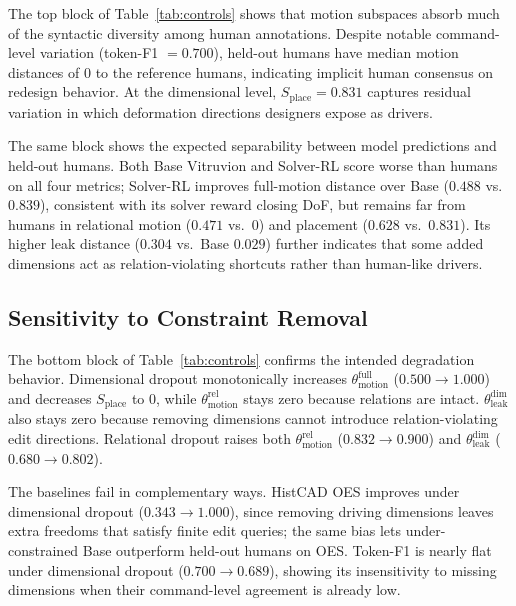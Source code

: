 The top block of Table~\ref{tab:controls} shows that motion subspaces absorb much of the syntactic diversity among human annotations. Despite notable command-level variation (token-F1 $=0.700$), held-out humans have median motion distances of $0$ to the reference humans, indicating implicit human consensus on redesign behavior. At the dimensional level, $S_{\mathrm{place}}=0.831$ captures residual variation in which deformation directions designers expose as drivers.

The same block shows the expected separability between model predictions and held-out humans. Both Base Vitruvion and Solver-RL score worse than humans on all four metrics; Solver-RL improves full-motion distance over Base ($0.488$ vs.\ $0.839$), consistent with its solver reward closing DoF, but remains far from humans in relational motion ($0.471$ vs.\ $0$) and placement ($0.628$ vs.\ $0.831$). Its higher leak distance ($0.304$ vs.\ Base $0.029$) further indicates that some added dimensions act as relation-violating shortcuts rather than human-like drivers.

\subsection{Sensitivity to Constraint Removal}
\label{sec:exp_degradation}

The bottom block of Table~\ref{tab:controls} confirms the intended degradation behavior. Dimensional dropout monotonically increases $\theta_{\mathrm{motion}}^{\mathrm{full}}$ ($0.500\!\to\!1.000$) and decreases $S_{\mathrm{place}}$ to $0$, while $\theta_{\mathrm{motion}}^{\mathrm{rel}}$ stays zero because relations are intact. $\theta_{\mathrm{leak}}^{\mathrm{dim}}$ also stays zero because removing dimensions cannot introduce relation-violating edit directions. Relational dropout raises both $\theta_{\mathrm{motion}}^{\mathrm{rel}}$ ($0.832\!\to\!0.900$) and $\theta_{\mathrm{leak}}^{\mathrm{dim}}$ ($0.680\!\to\!0.802$).

The baselines fail in complementary ways. HistCAD OES improves under dimensional dropout ($0.343\!\to\!1.000$), since removing driving dimensions leaves extra freedoms that satisfy finite edit queries; the same bias lets under-constrained Base outperform held-out humans on OES. Token-F1 is nearly flat under dimensional dropout ($0.700\!\to\!0.689$), showing its insensitivity to missing dimensions when their command-level agreement is already low.
